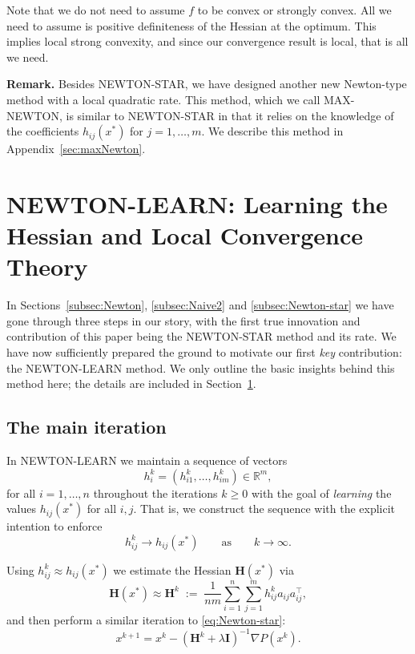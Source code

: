 \documentclass[12pt]{article}
\newcommand{\squeeze}{}
\newcommand{\eqdef}{\; { := }\;}
\newcommand{\R}{\mathbb{R}}
\newcommand{\newalpha}{h}
\newcommand{\mH}{\mathbf{H}}
\newcommand{\mI}{\mathbf{I}}
\begin{document}
Note that we do not need to assume $f$ to be convex or strongly convex. All we need to assume is positive definiteness of the Hessian at the optimum. This implies local strong convexity, and since our convergence result is local, that is all we need.

{\bf Remark.} Besides  {\sf NEWTON-STAR}, we have designed another new Newton-type method with a local quadratic rate.  This method, which we call {\sf MAX-NEWTON}, is  similar to {\sf NEWTON-STAR} in that it relies on the knowledge of the coefficients $\newalpha_{ij}(x^*)$  for $j=1,\dots,m$. We describe this method in Appendix~\ref{sec:maxNewton}. 

\section{{\sf NEWTON-LEARN}: Learning the Hessian and Local Convergence Theory} \label{sec:Newton-learn}

In Sections~\ref{subsec:Newton}, \ref{subsec:Naive2} and \ref{subsec:Newton-star} we have gone through three steps in our story,  with the first true innovation and contribution of this paper being the {\sf NEWTON-STAR} method and its rate. We have now sufficiently prepared the ground to motivate our first {\em key} contribution: the {\sf NEWTON-LEARN} method. We only outline the basic insights behind this method here; the details are included in Section~\ref{sec:Newton-learn}.  



\subsection{The main iteration}
In {\sf NEWTON-LEARN} we maintain a sequence of vectors \begin{equation}\label{eq:h_i^k}h_i^k=(h_{i1}^k,\dots, h_{im}^k) \in \R^m, \nonumber \end{equation} for all $i=1,\dots,n$ throughout the iterations $k\geq 0$  with the goal of {\em learning} the values $\newalpha_{ij}(x^*)$ for all $i,j$. That is, we construct the sequence with the explicit intention to enforce 
\begin{equation}\label{eq:learn} h_{ij}^k \to \newalpha_{ij}(x^*) \qquad \text{as} \qquad k\to \infty.\end{equation}

Using $h_{ij}^k \approx \newalpha_{ij}(x^*)$ we  estimate the Hessian $\mH(x^*)$ via
\begin{equation}\label{eq:Newton2-xx} 
\squeeze \mH(x^*) \approx \mH^k \eqdef  \frac{1}{nm}\sum \limits_{i=1}^n \sum \limits_{j=1}^m h^k_{ij}  a_{ij}a_{ij}^\top,\end{equation}
and then perform a similar iteration to \eqref{eq:Newton-star}:
\begin{equation} \label{eq:Newton-learn} x^{k+1} = x^k - \left(\mH^k + \lambda \mI\right)^{-1} \nabla P(x^k).\end{equation}
\end{document}
